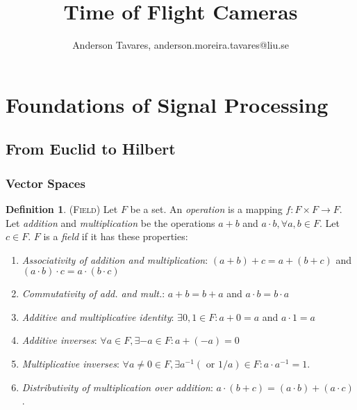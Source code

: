 \documentclass[9pt, twocolumn]{extarticle}
\title{Time of Flight Cameras}
\author{Anderson Tavares, anderson.moreira.tavares@liu.se}
\theoremstyle{definition}
\newtheorem{definition}{Definition}
\begin{document}
  \twocolumn[
  \begin{@twocolumnfalse}
    \noindent\centering\parbox{\textwidth}{%
      \centering {\bfseries\fontsize{14}{16}\selectfont\thetitle}\\{\fontsize{12}{14}\selectfont\theauthor}
  }
  
  \end{@twocolumnfalse}
  ]
  \section{Foundations of Signal Processing}
  \subsection{From Euclid to Hilbert}
  \subsubsection{Vector Spaces}
  
  \begin{definition}{(\textsc{Field})} 
    Let $ F $ be a set. An \emph{operation} is a mapping $ f:F\times F \rightarrow F$. Let \emph{addition} and \emph{multiplication} be the operations $ a + b$ and $ a\cdot b, \forall a,b\in F$. Let $ c \in F $. $ F $ is a \emph{field} if it has these properties:
    \begin{enumerate}[label=(\roman*)]
      \item \emph{Associativity of addition and multiplication}: $ (a+b)+c=a+(b+c) $ and $ (a\cdot b)\cdot c=a\cdot (b\cdot c) $
      
      \item \emph{Commutativity of add. and mult.}: $ a+b=b+a $ and $ a\cdot b=b\cdot a $
      \item \emph{Additive and multiplicative identity}: $ \exists 0, 1\in F: a+0=a $ and $ a\cdot 1=a $
      \item \emph{Additive inverses}: $\forall a\in F, \exists -a\in F: a+(-a)=0$
      \item \emph{Multiplicative inverses}: $\forall a\neq 0 \in F, \exists a^{-1}(\text{ or } 1/a)\in F: a\cdot a^{-1}=1$.
      \item \emph{Distributivity of multiplication over addition}: $ a\cdot(b+c) = (a\cdot b) + (a\cdot c) $.      
    \end{enumerate}    
  \end{definition}
\end{document}
